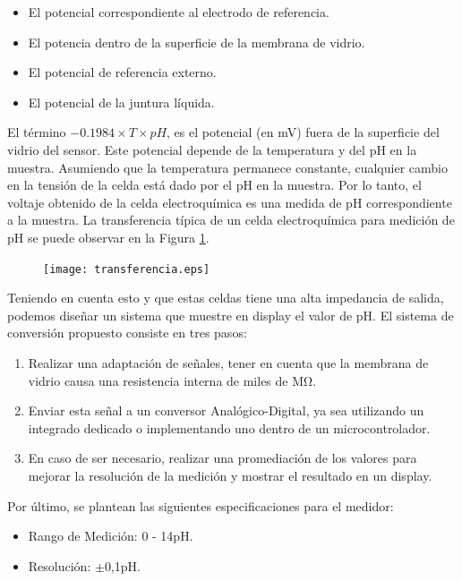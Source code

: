 \documentclass[10pt,a4paper]{article}
\begin{document}
\begin{itemize}
	\item {El potencial correspondiente al electrodo de referencia.}
	\item {El potencia dentro de la superficie de la membrana de vidrio.}
	\item {El potencial de referencia externo.}
	\item {El potencial de la juntura líquida.}
\end{itemize}

El término $-0.1984\times T\times pH$, es el potencial (en mV) fuera de la superficie del vidrio del sensor. Este potencial depende de la temperatura y del pH en la muestra. Asumiendo que la temperatura permanece constante, cualquier cambio en la tensión de la celda está dado por el pH en la muestra. Por lo tanto, el voltaje obtenido de la celda electroquímica es una medida de pH correspondiente a la muestra. La transferencia típica de un celda electroquímica para medición de pH se puede observar en la Figura \ref{fig2}.

\begin{figure}[h!]
	\texttt{[image: transferencia.eps]}
	\label{fig2}
\end{figure}

Teniendo en cuenta esto y que estas celdas tiene una alta impedancia de salida, podemos diseñar un sistema que muestre en display el valor de pH. El sistema de conversión propuesto consiste en tres pasos:

\begin{enumerate}
	\item {Realizar una adaptación de señales, tener en cuenta que la membrana de vidrio causa una resistencia interna de miles de M$\mathrm{\Omega}$.}
	\item {Enviar esta señal a un conversor Analógico-Digital, ya sea utilizando un integrado dedicado o implementando uno dentro de un microcontrolador.}
	\item {En caso de ser necesario, realizar una promediación de los valores para mejorar la resolución de la medición y mostrar el resultado en un display.}
\end{enumerate}

\clearpage

Por último, se plantean las siguientes especificaciones para el medidor:

\begin{itemize}
	\item{Rango de Medición: 0 - 14pH.}
	\item{Resolución: $\mathrm{\pm}$0,1pH.}
\end{itemize}
\end{document}
